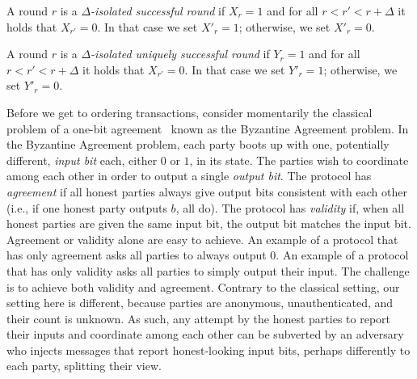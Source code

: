 \begin{definition}
A round $r$ is a \emph{$\Delta$-isolated successful round} if $X_r = 1$
and for all $r < r' < r + \Delta$ it holds that $X_{r'} = 0$. In that case we
set $X'_r = 1$; otherwise, we set $X'_r = 0$.

A round $r$ is a \emph{$\Delta$-isolated uniquely successful round} if $Y_r = 1$
and for all $r < r' < r + \Delta$ it holds that $X_{r'} = 0$. In that case we
set $Y'_r = 1$; otherwise, we set $Y'_r = 0$.
\end{definition}

Before we get to ordering transactions, consider momentarily the classical
problem of a one-bit agreement~\cite{lamport} known as the Byzantine
Agreement problem. In
the Byzantine Agreement problem, each party boots up with one, potentially
different, \emph{input bit} each, either $0$ or $1$, in its state. The parties
wish to coordinate among each other in order to output a single \emph{output
bit}. The protocol has \emph{agreement} if all honest parties always give output
bits consistent with each other (i.e., if one honest party outputs $b$, all do).
The protocol has \emph{validity} if, when all honest parties are given the same
input bit, the output bit matches the input bit. Agreement or validity alone are
easy to achieve. An example of a protocol that has only agreement asks
all parties to always output $0$. An example of a protocol that has only validity
asks all parties to simply output their input. The challenge is to achieve
both validity and agreement. Contrary to the classical setting, our setting here
is different, because parties are anonymous, unauthenticated, and their count is
unknown. As such, any attempt by the honest parties to report their inputs and
coordinate among each other can be subverted by an adversary who injects
messages that report honest-looking input bits, perhaps differently to each
party, splitting their view.

